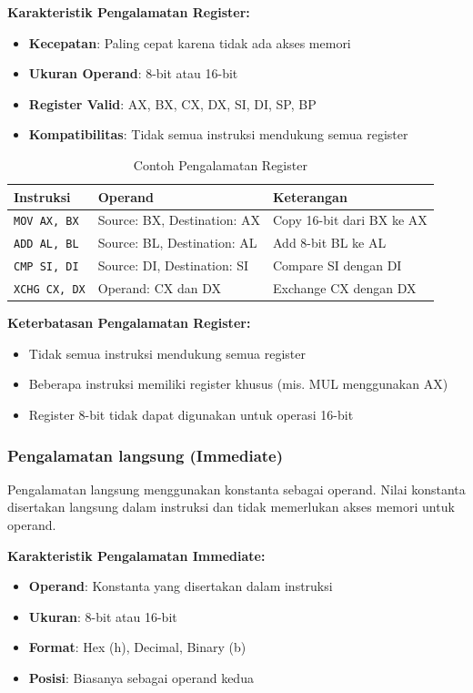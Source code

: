 \documentclass[../main.tex]{subfiles}
\begin{document}
\textbf{Karakteristik Pengalamatan Register:}
\begin{itemize}
    \item \textbf{Kecepatan}: Paling cepat karena tidak ada akses memori
    \item \textbf{Ukuran Operand}: 8-bit atau 16-bit
    \item \textbf{Register Valid}: AX, BX, CX, DX, SI, DI, SP, BP
    \item \textbf{Kompatibilitas}: Tidak semua instruksi mendukung semua register
\end{itemize}

\begin{table}[h]
\centering
\caption{Contoh Pengalamatan Register}
\begin{tabular}{|p{4cm}|p{4cm}|p{7cm}|}
\hline
\textbf{Instruksi} & \textbf{Operand} & \textbf{Keterangan} \\
\hline
\texttt{MOV AX, BX} & Source: BX, Destination: AX & Copy 16-bit dari BX ke AX \\
\hline
\texttt{ADD AL, BL} & Source: BL, Destination: AL & Add 8-bit BL ke AL \\
\hline
\texttt{CMP SI, DI} & Source: DI, Destination: SI & Compare SI dengan DI \\
\hline
\texttt{XCHG CX, DX} & Operand: CX dan DX & Exchange CX dengan DX \\
\hline
\end{tabular}
\label{tab:register-addressing-examples}
\end{table}

\textbf{Keterbatasan Pengalamatan Register:}
\begin{itemize}
    \item Tidak semua instruksi mendukung semua register
    \item Beberapa instruksi memiliki register khusus (mis. MUL menggunakan AX)
    \item Register 8-bit tidak dapat digunakan untuk operasi 16-bit
\end{itemize}

\subsubsection{Pengalamatan langsung (Immediate)}
Pengalamatan langsung menggunakan konstanta sebagai operand. Nilai konstanta disertakan langsung dalam instruksi dan tidak memerlukan akses memori untuk operand.

\textbf{Karakteristik Pengalamatan Immediate:}
\begin{itemize}
    \item \textbf{Operand}: Konstanta yang disertakan dalam instruksi
    \item \textbf{Ukuran}: 8-bit atau 16-bit
    \item \textbf{Format}: Hex (h), Decimal, Binary (b)
    \item \textbf{Posisi}: Biasanya sebagai operand kedua
\end{itemize}
\end{document}
